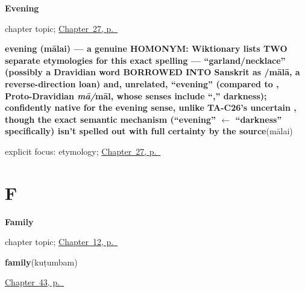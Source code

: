 \noindent\begin{minipage}[t]{\linewidth}
\raggedright
\textbf{Evening}\par
\footnotesize chapter topic; \hyperref[ch:ta-evening]{Chapter~27, p.~\pageref*{ch:ta-evening}}
\end{minipage}\par\smallskip

\noindent\begin{minipage}[t]{\linewidth}
\raggedright
\textbf{evening (mālai) — a genuine HOMONYM: Wiktionary lists TWO separate etymologies for this exact spelling — \textquotedblleft{}garland/necklace\textquotedblright{} (possibly a Dravidian word BORROWED INTO Sanskrit as /mālā, a reverse-direction loan) and, unrelated, \textquotedblleft{}evening\textquotedblright{} (compared to , Proto-Dravidian \emph{mā/}māl, whose senses include \textquotedblleft{},\textquotedblright{} darkness); confidently native for the evening sense, unlike TA-C26's uncertain , though the exact semantic mechanism (\textquotedblleft{}evening\textquotedblright{} $\leftarrow$ \textquotedblleft{}darkness\textquotedblright{} specifically) isn't spelled out with full certainty by the source}\enspace\emph{}\enspace(mālai)\par
\footnotesize explicit focus: etymology; \hyperref[ch:ta-evening]{Chapter~27, p.~\pageref*{ch:ta-evening}}
\end{minipage}\par\smallskip

\section*{F}

\noindent\begin{minipage}[t]{\linewidth}
\raggedright
\textbf{Family}\par
\footnotesize chapter topic; \hyperref[ch:ta-family]{Chapter~12, p.~\pageref*{ch:ta-family}}
\end{minipage}\par\smallskip

\noindent\begin{minipage}[t]{\linewidth}
\raggedright
\textbf{family}\enspace\emph{}\enspace(kuṭumbam)\par
\footnotesize \hyperref[ch:ta-household]{Chapter~43, p.~\pageref*{ch:ta-household}}
\end{minipage}\par\smallskip

